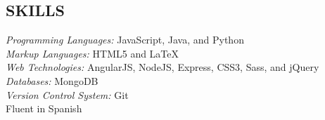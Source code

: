 \documentclass[line,margin,letterpaper]{res}
\begin{document}
\begin{resume}
\section{SKILLS}
  \emph{Programming Languages:} JavaScript, Java, and Python\\
  \emph{Markup Languages:} HTML5 and \LaTeX \\
  \emph{Web Technologies:} AngularJS, NodeJS, Express, CSS3, Sass, and jQuery \\
  \emph{Databases:} MongoDB \\
  \emph{Version Control System:} Git \\
  Fluent in Spanish

\end{resume}
\end{document}

